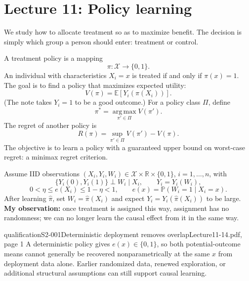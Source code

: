 \section{Lecture 11: Policy learning}
We study how to allocate treatment so as to maximize benefit. The decision is simply which group a person should enter: treatment or control.

A treatment policy is a mapping
\[
 \pi:\mathcal X\longrightarrow\{0,1\}.
\]
An individual with characteristics $X_i=x$ is treated if and only if $\pi(x)=1$. The goal is to find a policy that maximizes expected utility:
\[
 V(\pi)=\mathbb E[Y_i(\pi(X_i))].
\]
(The note takes $Y_i=1$ to be a good outcome.) For a policy class $\Pi$, define
\[
 \pi^*=\operatorname*{arg\,max}_{\pi'\in\Pi}V(\pi').
\]
The regret of another policy is
\[
 R(\pi)=\sup_{\pi'\in\Pi}V(\pi')-V(\pi).
\]
 The objective is to learn a policy with a guaranteed upper bound on worst-case regret: a minimax regret criterion.

Assume IID observations $(X_i,Y_i,W_i)\in\mathcal X\times\mathbb R\times\{0,1\}$, $i=1,\ldots,n$, with
\[
 \{Y_i(0),Y_i(1)\}\perp W_i\mid X_i,\qquad Y_i=Y_i(W_i),
\]
\[
 0<\eta\le e(X_i)\le1-\eta<1,\qquad e(x)=\mathbb P(W_i=1\mid X_i=x).
\]
After learning $\widehat\pi$, set $W_i=\widehat\pi(X_i)$ and expect $Y_i=Y_i(\widehat\pi(X_i))$ to be large. \textbf{My observation:} once treatment is assigned this way, assignment has no randomness; we can no longer learn the causal effect from it in the same way.

\begin{reviewnote}{qualification}{S2-001}{Deterministic deployment removes overlap}{Lecture11-14.pdf, page 1}
A deterministic policy gives $e(x)\in\{0,1\}$, so both potential-outcome means cannot generally be recovered nonparametrically at the same $x$ from deployment data alone. Earlier randomized data, renewed exploration, or additional structural assumptions can still support causal learning.
\end{reviewnote}



